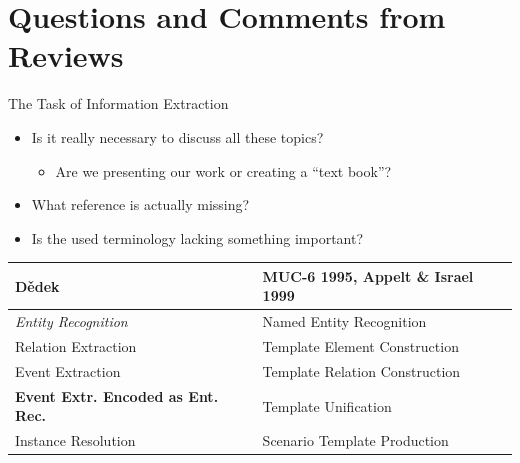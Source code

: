 \documentclass[xcolor=dvipsnames]{beamer}
\begin{document}
\resetcolor
\section[Questions \& Comments]{Questions and Comments from Reviews} 
\frame{\tableofcontents[currentsection]}

\begin{frame}{The Task of Information Extraction}
\begin{itemize}
	\item Is it really necessary to discuss all these topics?	
	\begin{itemize}
		\item Are we presenting our work or creating a ``text book''?
	\end{itemize}	
	\item What reference is actually missing?
	\item Is the used terminology lacking something important?
\end{itemize}
\begin{center}
	\begin{tabular}{l|l}
		Dědek & MUC-6 1995, Appelt \& Israel 1999\\
		\hline
		\emph{Entity Recognition} & Named Entity Recognition\\
		Relation Extraction & Template Element Construction\\
		Event Extraction & Template Relation Construction	\\
		\textbf{Event Extr. Encoded as Ent. Rec.} & Template Unification\\
		Instance Resolution & Scenario Template Production
	\end{tabular}
\end{center}
\end{frame}
\end{document}
